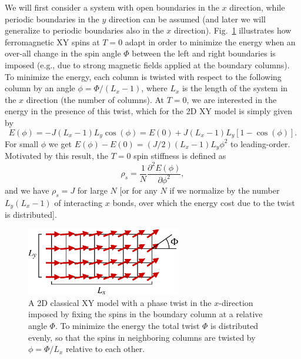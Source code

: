 \documentclass[draft,numberedheadings]{aipproc}
\begin{document}
We will first consider a system with open boundaries in the $x$ direction, while periodic boundaries in the $y$ direction can be assumed (and later we will 
generalize to periodic boundaries also in the $x$ direction). Fig.~\ref{xystiff} illustrates how ferromagnetic XY spins at $T=0$ adapt in order to minimize 
the energy when an over-all change in the spin angle $\Phi$ between the left and right boundaries is imposed (e.g., due to strong magnetic fields applied at the
boundary columns). To minimize the energy, each column is twisted with respect to the following column by an angle $\phi=\Phi/(L_x-1)$, where $L_x$ is the 
length of the system in the $x$ direction (the number of columns). At $T=0$, we are interested in the energy in the presence of this twist, which for 
the 2D XY model is simply given by
\begin{equation}
E(\phi)=-J(L_x-1)L_y\cos(\phi) = E(0)+J(L_x-1)L_y[1-\cos(\phi)]. 
\end{equation}
For small $\phi$ we get $E(\phi)-E(0) = (J/2)(L_x-1)L_y\phi^2$ to leading-order. Motivated by this result, the $T=0$ spin 
stiffness is defined as
\begin{equation}
\rho_s = \frac{1}{N} \frac{\partial^2 E(\phi)}{\partial \phi^2},
\label{stiffe0def}
\end{equation}
and we have $\rho_s=J$ for large $N$ [or for any $N$ if we normalize by the number $L_y(L_x-1)$ of interacting $x$ bonds, over which the energy cost 
due to the twist is distributed].

\begin{figure}
\includegraphics[width=6.75cm, clip]{xystiff.eps}
\caption{A 2D classical XY model with a phase twist in the $x$-direction imposed by fixing the spins in the boundary column at a relative angle 
$\Phi$. To minimize the energy the total twist $\Phi$ is distributed evenly, so that the spins in neighboring columns are twisted by 
$\phi=\Phi/L_x$ relative to each other.}
\label{xystiff}
\end{figure}
\end{document}
